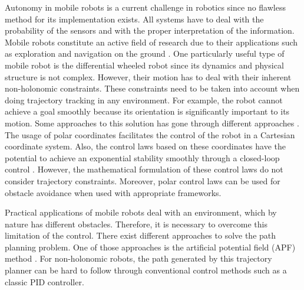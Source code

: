 \documentclass[conference]{IEEEtran}
\begin{document}
Autonomy in mobile robots is a current challenge in robotics since no flawless method for its implementation exists. All systems have to deal with the probability of the sensors and with the proper interpretation of the information. Mobile robots constitute an active field of research due to their applications such as exploration and navigation on the ground \cite{Bonin-Font2008}.
One particularly useful type of mobile robot is the differential wheeled robot since its dynamics and physical structure is not complex. However, their motion has to deal with their inherent non-holonomic constraints.
These constraints need to be taken into account when doing trajectory tracking in any environment. For example, the robot cannot achieve a goal smoothly because its orientation is significantly important to its motion. Some approaches to this solution has gone through different approaches \cite{Rubayat}. 
The usage of polar coordinates facilitates the control of the robot in a Cartesian coordinate system. Also, the control laws based on these coordinates have the potential to achieve an exponential stability smoothly through a closed-loop control \cite{Matoui}. However, the mathematical formulation of these control laws do not consider trajectory constraints. Moreover, polar control laws can be used for obstacle avoidance when used with appropriate frameworks. 

Practical applications of mobile robots deal with an environment, which by nature has different obstacles. Therefore, it is necessary to overcome this limitation of the control. There exist different approaches to solve the path planning problem. One of those approaches is the artificial potential field (APF) method \cite{Woods}. For non-holonomic robots, the path generated by this trajectory planner can be hard to follow through conventional control methods such as a classic PID controller. 
\end{document}
